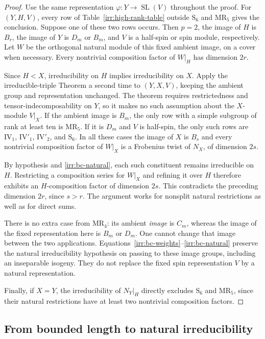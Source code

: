 \begin{proof}
Use the same representation
$\varphi:Y\longrightarrow\operatorname{SL}(V)$ throughout the proof.
For $(Y,H,V)$, every row of Table~\ref{irr:high-rank-table} outside
$\mathrm S_6$ and $\mathrm {MR}_5$ gives the conclusion.  Suppose one of
these two rows occurs.  Then $p=2$, the image of $H$ is $B_r$, the image of
$Y$ is $D_m$ or $B_m$, and $V$ is a half-spin or spin module, respectively.
Let $W$ be the orthogonal natural module of this fixed ambient image, on
a cover when necessary.  Every nontrivial composition factor of $W|_H$
has dimension $2r$.

Since $H<X$, irreducibility on $H$ implies irreducibility on $X$.
Apply the irreducible-triple Theorem a second time to $(Y,X,V)$, keeping
the ambient group and representation unchanged.  The theorem requires
restrictedness and tensor-indecomposability on $Y$, so it makes no such
assumption about the $X$-module $V|_X$.
If the ambient image is $B_m$, the only row with a simple subgroup of rank
at least ten is $\mathrm {MR}_5$.
If it is $D_m$ and $V$ is half-spin, the only such rows are
$\mathrm {IV}_1$, $\mathrm {IV}'_1$, $\mathrm {IV}'_2$, and $\mathrm S_6$.
In all these cases the image of $X$ is $B_s$ and every nontrivial composition
factor of $W|_X$ is a Frobenius twist of $N_X$, of dimension $2s$.

By hypothesis and \eqref{irr:bc-natural}, each such constituent remains
irreducible on $H$.  Restricting a composition series for $W|_X$ and refining
it over $H$ therefore exhibits an $H$-composition factor of dimension $2s$.
This contradicts the preceding dimension $2r$, since $s>r$.
The argument works for nonsplit natural restrictions as well as for direct
sums.

There is no extra case from $\mathrm {MR}_4$: its ambient \emph{image} is
$C_m$, whereas the image of the fixed representation here is $B_m$ or $D_m$.
One cannot change that image between the two applications.
Equations~\eqref{irr:bc-weights}--\eqref{irr:bc-natural} preserve the natural
irreducibility hypothesis on passing to these image groups, including an
inseparable isogeny.  They do not replace the fixed spin representation $V$
by a natural representation.

Finally, if $X=Y$, the irreducibility of $N_Y|_H$ directly excludes
$\mathrm S_6$ and $\mathrm {MR}_5$, since their natural restrictions have at
least two nontrivial composition factors.
\end{proof}

\subsection{From bounded length to natural irreducibility}

